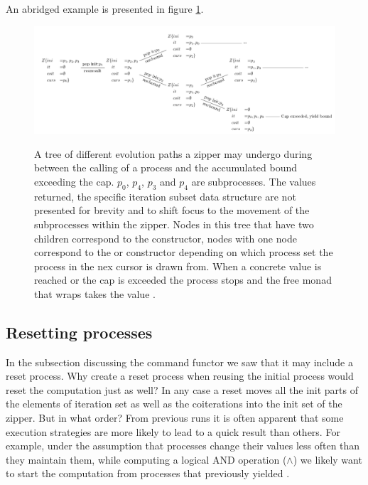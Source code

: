 An abridged example is presented in figure \ref{fig:cmds_tree}.

\begin{figure}[H]
\centering
\includegraphics[width=\textwidth]{./imgs/cmds_tree.pdf}
\label{fig:cmds_tree}
\caption{A tree of different evolution paths a
  zipper may undergo during between the calling of a process and the
  accumulated bound exceeding the cap. \(p_0\), \(p_4\), \(p_3\) and
  \(p_4\) are subprocesses. The values returned, the specific
  iteration subset data structure are not presented for brevity and to
  shift focus to the movement of the subprocesses within the
  zipper. Nodes in this tree that have two children correspond to the
   constructor, nodes with one node correspond to the
   or  constructor depending on which
  process set the process in the nex cursor is drawn from. When a
  concrete value is reached or the cap is exceeded the process stops
  and the free monad that wraps  takes the value
  .}
\end{figure}

\subsection{Resetting processes}
\label{sec:process_resetting}

In the subsection discussing the command functor we saw that it may
include a reset process. Why create a reset process when reusing the
initial process would reset the computation just as well? In any case
a reset moves all the init parts of the elements of iteration set as
well as the coiterations into the init set of the zipper. But in what
order? From previous runs it is often apparent that some execution
strategies are more likely to lead to a quick result than others. For
example, under the assumption that processes change their values less
often than they maintain them, while computing a logical AND operation
(\(\land\)) we likely want to start the computation from processes
that previously yielded .

